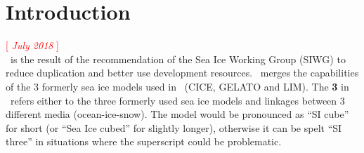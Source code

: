 

\chapter*{Introduction}

\textcolor{red}{[ \textit{July 2018} ]} \\


\SIcube\ is the result of the recommendation of the Sea Ice Working Group (SIWG) to
reduce duplication and better use development resources.
\SIcube\ merges the capabilities of the 3 formerly sea ice models used in \NEMO\ (CICE, GELATO and LIM).
The \textbf{3} in \SIcube\ refers either to the three formerly used sea ice models and
linkages between 3 different media (ocean-ice-snow).
The model would be pronounced as ``SI cube'' for short (or ``Sea Ice cubed'' for slightly longer),
otherwise it can be spelt ``SI three'' in situations where the superscript could be problematic.


